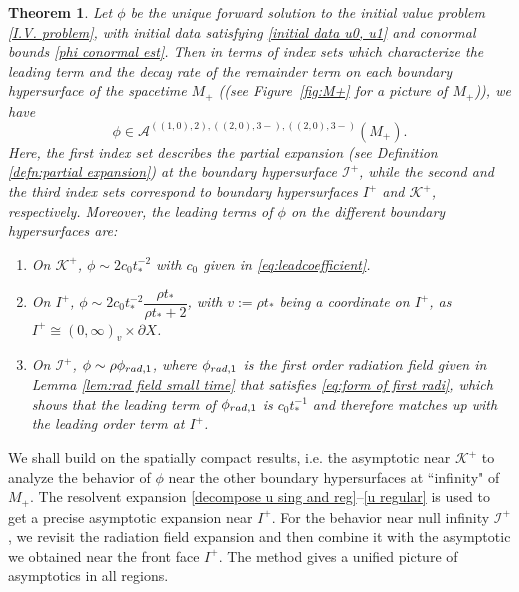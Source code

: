 \documentclass[10pt,a4paper,reqno]{amsart}
\newcommand{\A}{\mathcal{A}}
\newtheorem{theorem}{Theorem}[section]
\theoremstyle{definition}
\theoremstyle{remark}
\numberwithin{equation}{section}
\newcommand{\calK}{\mathcal K}
\newcommand{\ts}{t_*}
\begin{document}
\begin{theorem}
\label{thm:global main_body text}
Let $\phi$ be the unique forward solution to the initial value problem \eqref{I.V. problem}, with initial data satisfying \eqref{initial data u0, u1} and conormal bounds \eqref{phi conormal est}. Then in terms of index sets which characterize the leading term and the decay rate of the remainder term on each boundary hypersurface of the spacetime $M_+$ ((see Figure~\ref{fig:M+} for a picture of $M_+$)), we have
\[
    \phi \in \A^{((1,0),2),((2,0),3-),((2,0),3-)}(M_+).
\]
Here, the first index set describes the partial expansion (see Definition \ref{defn:partial expansion}) at the boundary hypersurface $\mathscr{I^+}$, while the second and the third index sets correspond to boundary hypersurfaces $I^+$ and $\mathcal{K}^+$, respectively. Moreover, the leading terms of $\phi$ on the different boundary hypersurfaces are:
\begin{enumerate}
    \item On $\calK^+$, $\phi \sim 2 c_0 t_*^{-2}$ with $c_0$ given in \eqref{eq:leadcoefficient}.
    
    \item On $I^+$, $\phi \sim 2c_0 \ts^{-2} \dfrac{\rho \ts}{\rho \ts + 2}$, with $v:=\rho\ts$ being a coordinate on $I^+$, as $I^+\cong (0,\infty)_v \times\partial X$.
    
    \item On $\mathscr{I}^+$, 
    $\phi \sim\rho \phi_{{\rm rad},1}$, where $\phi_{{\rm rad},1}$ is the first order radiation field given in Lemma \ref{lem:rad field small time} that satisfies \eqref{eq:form of first radi}, which shows that the leading term of $\phi_{{\rm rad},1}$ is  $c_0 t_*^{-1}$ and therefore matches up with the leading order term at $I^+$. 
\end{enumerate}
\end{theorem}

We shall build on the spatially compact results, i.e. the asymptotic near $\mathcal{K}^+$ to analyze the behavior of $\phi$ near the other boundary hypersurfaces at ``infinity" of $M_+$. The resolvent expansion \eqref{decompose u sing and reg}--\eqref{u regular} is used to get a precise asymptotic expansion near $I^+$. For the behavior near null infinity $\mathscr{I}^+$, we revisit the radiation field expansion and then combine it with the asymptotic we obtained near the front face $I^+$. The method gives a unified picture of asymptotics in all regions.
\end{document}
